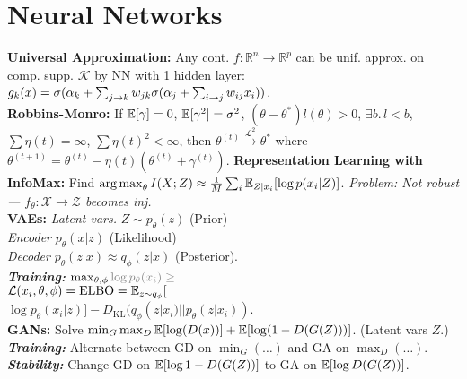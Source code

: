 \section*{Neural Networks}
\textbf{Universal Approximation:} Any cont. $f:\mathbb{R}^n\to\mathbb{R}^p$ can be unif. approx. on comp. supp. $\mathcal{K}$ by NN with 1 hidden layer: $g_k(x)=\sigma(\alpha_k+\sum_{j\to k}w_{jk}\sigma(\alpha_j+\sum_{i\to j} w_{ij}x_i))$.\\
\textbf{Robbins-Monro:} If $\mathbb{E}[\gamma]=0$, $\mathbb{E}[\gamma^2]=\sigma^2$, $(\theta-\theta^*)l(\theta) > 0$, $\exists b.\,l<b$, $\sum\eta(t) = \infty$, $\sum\eta(t)^2 < \infty$, then
$\theta^{(t)}\overset{\mathcal{L}^2}{\to}\theta^*$ where
$\theta^{(t+1)} = \theta^{(t)} - \eta(t)(\theta^{(t)}+\gamma^{(t)})$.
\textbf{Representation Learning with InfoMax:} Find $\operatorname*{arg\,max}_\theta I(X;Z) \approx \frac{1}{M}\sum_i\mathbb{E}_{Z|x_i}[\log p(x_i|Z)]$. \emph{Problem: Not robust --- $f_\theta:\mathcal{X}\to\mathcal{Z}$ becomes inj.}\\
\textbf{VAEs:} \emph{Latent vars.} $Z\sim p_\theta(z)$ (Prior)\\
\emph{Encoder} $p_\theta(x|z)$ (Likelihood)\\
\emph{Decoder} $p_\theta(z|x)\approx q_\phi(z|x)$ (Posterior).\\
\emph{\textbf{Training:}} $\max_{\theta,\phi} {\color{gray}\log p_\theta(x_i) \geq}$\\$ \mathcal{L}(x_i,\theta,\phi) = \mathrm{ELBO} = \mathbb{E}_{z\sim q_\phi}[$\\$\log p_\theta(x_i|z)] - D_{\mathrm{KL}}(q_\phi(z|x_i)||p_\theta(z|x_i))$.\\
\textbf{GANs:} Solve $\min_G\max_D\mathbb{E}[\log(D(x))] + \mathbb{E}[\log(1-D(G(Z)))]$. (Latent vars $Z$.)\\
\emph{\textbf{Training:}} Alternate between GD on $\min_G(\dots)$ and GA on $\max_D(\ldots)$.\\
\emph{\textbf{Stability:}} Change GD on $\mathbb{E}[\log 1-D(G(Z))]$ to GA on $\mathbb{E}[\log D(G(Z))]$.


